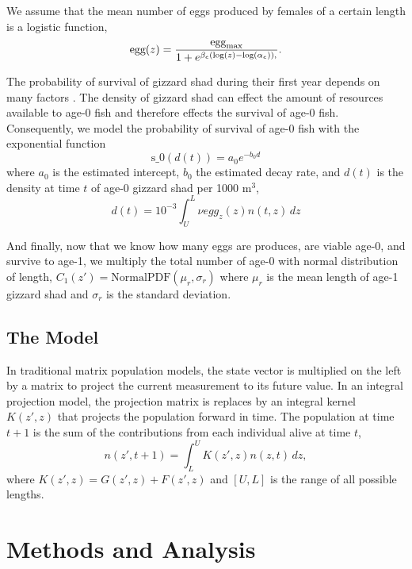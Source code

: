 \documentclass[11pt,oneside]{amsart}
\def\ds{\displaystyle}
\theoremstyle{definition}
\begin{document}
We assume that the mean number of eggs produced by females of a certain length is a logistic function,
\begin{equation}\label{eq:egg}
\mbox{egg}(z) = \frac{\mbox{egg}_{\rm max}}{1+e^{\beta_e(\log(z)-\log(\alpha_e)),}}.
\end{equation}

The probability of survival of gizzard shad during their first year depends on many factors \citep{michaletz2010overwinter}.  The density of gizzard shad can effect the amount of resources available to age-0 fish and therefore effects the survival of age-0 fish. Consequently, we model the probability of survival of age-0 fish with the exponential function
\begin{equation}\label{eq:s0}
\mbox{s_0}(d(t)) = a_0 e^{-b_0 d}
\end{equation}
where $a_0$ is the estimated intercept, $b_0$ the estimated decay rate, and $d(t)$ is the density at time $t$ of age-0 gizzard shad per 1000 m$^3$, 
\[ d(t) = 10^{-3} \int_U^L \nu egg_z(z) n(t,z) \, dz \]  

And finally, now that we know how many eggs are produces, are viable age-0, and survive to age-1, we multiply the total number of age-0 with normal distribution of length,
$ \ds C_1 (z') =  \mathrm{Normal PDF} (\mu_r, \sigma_r)$ where $\mu_r$ is the mean length of age-1 gizzard shad and $\sigma_r$ is the standard deviation. 

\subsection{The Model} 
In traditional matrix population models, the state vector is multiplied on the left by a matrix to project the current measurement to its future value.  In an integral projection model, the projection matrix is replaces by an integral kernel $K(z',z)$ that projects the population forward in time.  The population at time $t+1$ is the sum of the contributions from each individual alive at time $t$,
\begin{equation}\label{eq:IPM}
n(z',t+1) = \int_L^U K(z',z)n(z,t) \,dz,
\end{equation}  
where $K(z',z) = G(z',z) + F(z',z)$ and $[U,L]$ is the range of all possible lengths.

\section{Methods and Analysis}
\end{document}
